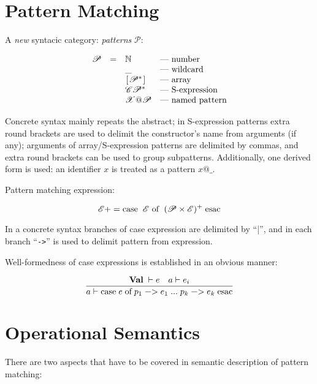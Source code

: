 \documentclass{article}
\author{Dmitry Boulytchev}
\newcommand{\trule}[2]{\dfrac{#1}{#2}}
\newcommand{\withenv}[2]{{#1}\vdash{#2}}
\newcommand{\llang}[1]{\mbox{\lstinline[mathescape]|#1|}}
\newcommand{\primi}[2]{\mathbf{#1}\;{#2}}
\theoremstyle{definition}
\begin{document}
\section{Pattern Matching}

A \emph{new} syntacic category: \emph{patterns} $\mathscr P$:

\[
\begin{array}{rcll}
  \mathscr P & = & \mathbb N & \mbox{--- number}\\
             &   & \_        & \mbox{--- wildcard}\\
             &   & \llang{[}\mathscr P^*\llang{]} & \mbox{--- array}\\
             &   & \mathscr C \mathscr P^* & \mbox{--- S-expression} \\
             &   & \mathscr X \llang{@} \mathscr P& \mbox{--- named pattern}
\end{array}
\]

Concrete syntax mainly repeats the abstract; in S-expression patterns extra round brackets are used to delimit the constructor's name from arguments (if any); arguments
of array/S-expression patterns are delimited by commas, and extra round brackets can be used to group subpatterns. Additionally, one derived form is used: an identifier
$x$ is treated as a pattern $x@\_$.

Pattern matching expression:

\[
\mathscr E += \llang{case}\;\; \mathscr E \;\llang{of}\;\; (\mathscr P \times \mathscr E)^+ \;\llang{esac}
\]

In a concrete syntax branches of case expression are delimited by ``\llang{|}'', and in each branch ``\llang{->}'' is used to delimit pattern from expression.

Well-formedness of case expressions is established in an obvious manner:

\ifdefined\Ref
  \renewcommand{\Ref}{\primi{Ref}{}}
\else
  \newcommand{\Ref}{\primi{Ref}{}}
\fi
\newcommand{\Val}{\primi{Val}{}}
\newcommand{\Void}{\primi{Void}{}}

\[
\renewcommand{\withenv}[2]{{#2}:{#1}}
\trule{\withenv{\Val}{e}\quad\withenv{a}{e_i}}
      {\withenv{a}{\llang{case $\;e\;$ of $\;p_1\;$ -> $\;e_1\;$ ... $\;p_k\;$ -> $\;e_k\;$ esac}}}
\]

\section{Operational Semantics}

There are two aspects that have to be covered in semantic description of pattern matching:
\end{document}
